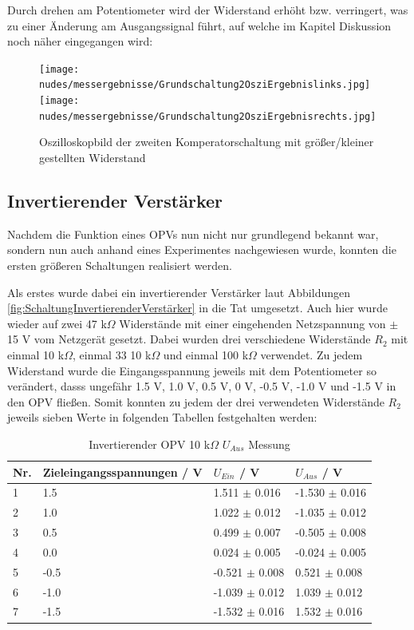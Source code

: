 \documentclass[12pt,a4paper,twoside]{article}
\begin{document}
\noindent
Durch drehen am Potentiometer wird der Widerstand erhöht bzw. verringert, was zu einer Änderung am Ausgangssignal führt, auf welche im Kapitel Diskussion noch näher eingegangen wird:

\begin{figure}[H]
    \centering
    \texttt{[image: nudes/messergebnisse/Grundschaltung2OsziErgebnislinks.jpg]}
    \texttt{[image: nudes/messergebnisse/Grundschaltung2OsziErgebnisrechts.jpg]}
    \caption{Oszilloskopbild der zweiten Komperatorschaltung mit größer/kleiner gestellten Widerstand}
    \label{fig:Grundschaltung2ErgebnissPoti}
\end{figure}

\subsection{Invertierender Verstärker}

Nachdem die Funktion eines OPVs nun nicht nur grundlegend bekannt war, sondern nun auch anhand eines Experimentes nachgewiesen wurde, konnten die ersten größeren Schaltungen realisiert werden. \newline

\noindent
Als erstes wurde dabei ein invertierender Verstärker laut Abbildungen \ref{fig:SchaltungInvertierenderVerstärker} in die Tat umgesetzt. Auch hier wurde wieder auf zwei 47 k$\Omega$ Widerstände mit einer eingehenden Netzspannung von $\pm$ 15 V vom Netzgerät gesetzt.
Dabei wurden drei verschiedene Widerstände $R_{2}$ mit einmal 10 k$\Omega$, einmal 33 10 k$\Omega$ und einmal 100 k$\Omega$ verwendet. Zu jedem Widerstand wurde die Eingangsspannung jeweils mit dem Potentiometer so verändert, dasss ungefähr 1.5 V, 1.0 V, 0.5 V, 0 V, -0.5 V, -1.0 V und -1.5 V in den OPV fließen. 
Somit konnten zu jedem der drei verwendeten Widerstände $R_{2}$ jeweils sieben Werte in folgenden Tabellen festgehalten werden:

\begin{table}[H]
    \centering
    \caption{Invertierender OPV 10 k$\Omega$ $U_{Aus}$ Messung}
    \label{tab:IoVerstärkungenGemessen10}
    \begin{tabular}{| l | l | l | l |}
        \hline
        Nr. & Zieleingangsspannungen / V & $U_{Ein}$ / V & $U_{Aus}$ / V \\
        \hline
        1 &  1.5 &  1.511 $\pm$ 0.016 & -1.530 $\pm$ 0.016 \\
        2 &  1.0 &  1.022 $\pm$ 0.012 & -1.035 $\pm$ 0.012 \\
        3 &  0.5 &  0.499 $\pm$ 0.007 & -0.505 $\pm$ 0.008 \\
        4 &  0.0 &  0.024 $\pm$ 0.005 & -0.024 $\pm$ 0.005 \\
        5 & -0.5 & -0.521 $\pm$ 0.008 &  0.521 $\pm$ 0.008 \\
        6 & -1.0 & -1.039 $\pm$ 0.012 &  1.039 $\pm$ 0.012 \\
        7 & -1.5 & -1.532 $\pm$ 0.016 &  1.532 $\pm$ 0.016 \\
        \hline
    \end{tabular}
\end{table}
\end{document}
